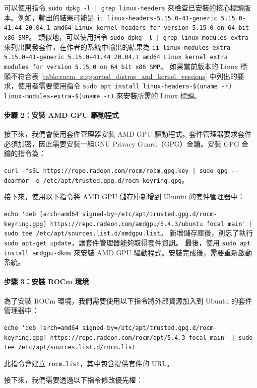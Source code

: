 可以使用指令 \lstinline!sudo dpkg -l | grep linux-headers! 來檢查已安裝的核心標頭版本。例如，輸出的結果可能是 \lstinline|ii linux-headers-5.15.0-41-generic 5.15.0-41.44 20.04.1 amd64 Linux kernel headers for version 5.15.0 on 64 bit x86 SMP|。
類似地，可以使用指令 \lstinline!sudo dpkg -l | grep linux-modules-extra! 來列出開發套件，在作者的系統中輸出的結果為
\lstinline|ii linux-modules-extra-5.15.0-41-generic 5.15.0-41.44 20.04.1 amd64 Linux kernel extra modules for version 5.15.0 on 64 bit x86 SMP|。
如果當前版本的 Linux 標頭不符合表 \ref{table:rocm_supported_distros_and_kernel_versions} 中列出的要求，使用者需要使用指令 \lstinline|sudo apt install linux-headers-$(uname -r) linux-modules-extra-$(uname -r)| 來安裝所需的 Linux 標頭。


\paragraph{步驟 2：安裝 AMD GPU 驅動程式}
接下來，我們會使用套件管理器安裝 AMD GPU 驅動程式。套件管理器要求套件必須加密，因此需要安裝一組GNU Privacy Guard（GPG）金鑰。安裝 GPG 金鑰的指令為：

\lstinline!curl -fsSL https://repo.radeon.com/rocm/rocm.gpg.key | sudo gpg --dearmor -o /etc/apt/trusted.gpg.d/rocm-keyring.gpg!。

接下來，使用以下指令將 AMD GPU 儲存庫新增到 Ubuntu 的套件管理器中：

\lstinline!echo 'deb [arch=amd64 signed-by=/etc/apt/trusted.gpg.d/rocm-keyring.gpg] https://repo.radeon.com/amdgpu/5.4.3/ubuntu focal main' | sudo tee /etc/apt/sources.list.d/amdgpu.list!。
新增儲存庫後，別忘了執行 \lstinline|sudo apt-get update|，讓套件管理器能夠取得套件資訊。
最後，使用 \lstinline|sudo apt install amdgpu-dkms| 來安裝 AMD GPU 驅動程式。安裝完成後，需要重新啟動系統。

\paragraph{步驟 3：安裝 ROCm 環境}
為了安裝 ROCm 環境，我們需要使用以下指令將外部資源加入到 Ubuntu 的套件管理器中：

\lstinline!echo 'deb [arch=amd64 signed-by=/etc/apt/trusted.gpg.d/rocm-keyring.gpg] https://repo.radeon.com/rocm/apt/5.4.3 focal main' | sudo tee /etc/apt/sources.list.d/rocm.list!

此指令會建立 \lstinline|rocm.list|，其中包含提供套件的 URL。

接下來，我們需要透過以下指令修改優先權：

